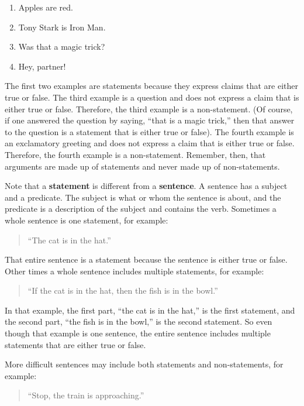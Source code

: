 \documentclass[
]{book}
\providecommand{\tightlist}{%
  \setlength{\itemsep}{0pt}\setlength{\parskip}{0pt}}
\begin{document}
\begin{reflect}
\begin{enumerate}
\def\labelenumi{\arabic{enumi}.}
\tightlist
\item
  Apples are red.
\item
  Tony Stark is Iron Man.
\item
  Was that a magic trick?
\item
  Hey, partner!
\end{enumerate}

The first two examples are statements because they express claims that are either true or false. The third example is a question and does not express a claim that is either true or false. Therefore, the third example is a non-statement. (Of course, if one answered the question by saying, ``that is a magic trick,'' then that answer to the question is a statement that is either true or false). The fourth example is an exclamatory greeting and does not express a claim that is either true or false. Therefore, the fourth example is a non-statement. Remember, then, that arguments are made up of statements and never made up of non-statements.

Note that a \textbf{statement} is different from a \textbf{sentence}. A sentence has a subject and a predicate. The subject is what or whom the sentence is about, and the predicate is a description of the subject and contains the verb. Sometimes a whole sentence is one statement, for example:

\begin{quote}
``The cat is in the hat.''
\end{quote}

That entire sentence is a statement because the sentence is either true or false. Other times a whole sentence includes multiple statements, for example:

\begin{quote}
``If the cat is in the hat, then the fish is in the bowl.''
\end{quote}

In that example, the first part, ``the cat is in the hat,'' is the first statement, and the second part, ``the fish is in the bowl,'' is the second statement. So even though that example is one sentence, the entire sentence includes multiple statements that are either true or false.

More difficult sentences may include both statements and non-statements, for example:

\begin{quote}
``Stop, the train is approaching.''
\end{quote}


\end{reflect}
\end{document}
